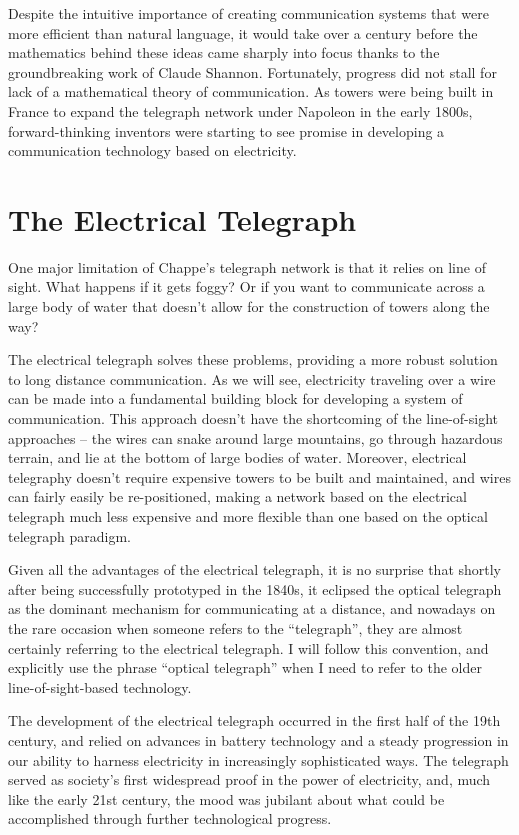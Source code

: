 \documentclass[UTF8]{book}
\begin{document}
\begin{CJK}{UTF8}{gbsn}
Despite the intuitive importance of creating communication systems that were more efficient than natural language, it would take over a century before the mathematics behind these ideas came sharply into focus thanks to the groundbreaking work of Claude Shannon. Fortunately, progress did not stall for lack of a mathematical theory of communication. As towers were being built in France to expand the telegraph network under Napoleon in the early 1800s, forward-thinking inventors were starting to see promise in developing a communication technology based on electricity.

\chapter{The Electrical Telegraph}

One major limitation of Chappe's telegraph network is that it relies on line of sight. What happens if it gets foggy? Or if you want to communicate across a large body of water that doesn't allow for the construction of towers along the way?

The electrical telegraph solves these problems, providing a more robust solution to long distance communication. As we will see, electricity traveling over a wire can be made into a fundamental building block for developing a system of communication. This approach doesn't have the shortcoming of the line-of-sight approaches – the wires can snake around large mountains, go through hazardous terrain, and lie at the bottom of large bodies of water. Moreover, electrical telegraphy doesn't require expensive towers to be built and maintained, and wires can fairly easily be re-positioned, making a network based on the electrical telegraph much less expensive and more flexible than one based on the optical telegraph paradigm.

Given all the advantages of the electrical telegraph, it is no surprise that shortly after being successfully prototyped in the 1840s, it eclipsed the optical telegraph as the dominant mechanism for communicating at a distance, and nowadays on the rare occasion when someone refers to the ``telegraph'', they are almost certainly referring to the electrical telegraph. I will follow this convention, and explicitly use the phrase ``optical telegraph'' when I need to refer to the older line-of-sight-based technology.

The development of the electrical telegraph occurred in the first half of the 19th century, and relied on advances in battery technology and a steady progression in our ability to harness electricity in increasingly sophisticated ways. The telegraph served as society's first widespread proof in the power of electricity, and, much like the early 21st century, the mood was jubilant about what could be accomplished through further technological progress.


\end{CJK}
\end{document}
